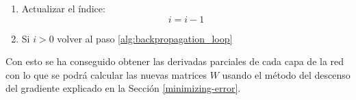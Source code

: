 \begin{enumerate}
    \item Actualizar el índice:
    \begin{equation}
    i = i-1
    \end{equation}
    
    \item Si $i>0$ volver al paso \ref{alg:backpropagation_loop}
\end{enumerate}

Con esto se ha conseguido obtener las derivadas parciales de cada capa de la red con lo que se podrá calcular las nuevas matrices $W$ usando el método del descenso del gradiente explicado en la Sección \ref{minimizing-error}.